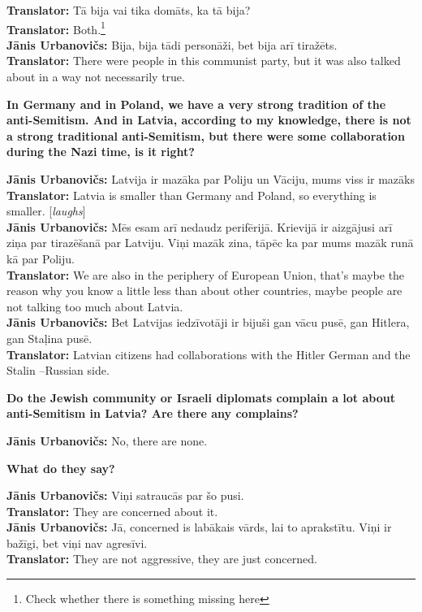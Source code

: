 \textbf{Translator:} Tā bija vai tika domāts, ka tā bija? \\
\textbf{Translator:} Both.\footnote{Check whether there is something missing here}\\
\textbf{Jānis Urbanovičs:} Bija, bija tādi personāži, bet bija arī tiražēts.\\
\textbf{Translator:} There were people in this communist party, but it was also talked about in a way not necessarily true. 

\textbf{In Germany and in Poland, we have a very strong tradition of the anti-Semitism. And in Latvia, according to my knowledge, there is not a strong traditional anti-Semitism, but there were some collaboration during the Nazi time, is it right?} 

\textbf{Jānis Urbanovičs:} Latvija ir mazāka par Poliju un Vāciju, mums viss ir mazāks\\  
\textbf{Translator:} Latvia is smaller than Germany and Poland, so everything is smaller. [\textit{laughs}]\\
\textbf{Jānis Urbanovičs:} Mēs esam arī nedaudz perifērijā. Krievijā ir aizgājusi arī ziņa par tirazēšanā par Latviju. Viņi mazāk zina, tāpēc ka par mums mazāk runā kā par Poliju.\\  
\textbf{Translator:} We are also in the periphery of European Union, that’s maybe the reason why you know a little less than about other countries, maybe people are not talking too much about Latvia.\\ 
\textbf{Jānis Urbanovičs:} Bet Latvijas iedzīvotāji ir bijuši gan vācu pusē, gan Hitlera, gan Staļina pusē.\\
\textbf{Translator:} Latvian citizens had collaborations with the Hitler German and the Stalin –Russian side. 

\textbf{Do the Jewish community or Israeli diplomats complain a lot about anti-Semitism in Latvia? Are there any complains?}  

\textbf{Jānis Urbanovičs:} No, there are none. 

\textbf{What do they say?}  

\textbf{Jānis Urbanovičs:} Viņi satraucās par šo pusi.\\
\textbf{Translator:} They are concerned about it.\\  
\textbf{Jānis Urbanovičs:} Jā, concerned is labākais vārds, lai to aprakstītu. Viņi ir bažīgi, bet viņi nav agresīvi. \\
\textbf{Translator:} They are not aggressive, they are just concerned.  

